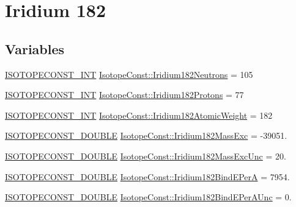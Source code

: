 \hypertarget{group___isotope_const-_iridium-_ir182}{}\section{Iridium 182}
\label{group___isotope_const-_iridium-_ir182}
\subsection*{Variables}
\begin{DoxyCompactItemize}
\item 
\mbox{\hyperlink{group___isotope_const-_macros_ga5f18360b3e99483a35c32d789e62621c}{I\+S\+O\+T\+O\+P\+E\+C\+O\+N\+S\+T\+\_\+\+I\+NT}} \mbox{\hyperlink{group___isotope_const-_iridium-_ir182_gabb4e1b8047cf5df11a85dc624a50e36e}{Isotope\+Const\+::\+Iridium182\+Neutrons}} = 105
\item 
\mbox{\hyperlink{group___isotope_const-_macros_ga5f18360b3e99483a35c32d789e62621c}{I\+S\+O\+T\+O\+P\+E\+C\+O\+N\+S\+T\+\_\+\+I\+NT}} \mbox{\hyperlink{group___isotope_const-_iridium-_ir182_ga7036bb3d763cc69754fbcff4b23de615}{Isotope\+Const\+::\+Iridium182\+Protons}} = 77
\item 
\mbox{\hyperlink{group___isotope_const-_macros_ga5f18360b3e99483a35c32d789e62621c}{I\+S\+O\+T\+O\+P\+E\+C\+O\+N\+S\+T\+\_\+\+I\+NT}} \mbox{\hyperlink{group___isotope_const-_iridium-_ir182_ga831ca03cf5ecca7d496893c365608e22}{Isotope\+Const\+::\+Iridium182\+Atomic\+Weight}} = 182
\item 
\mbox{\hyperlink{group___isotope_const-_macros_ga8f45a7272ce02c0b4c65c44636ed719a}{I\+S\+O\+T\+O\+P\+E\+C\+O\+N\+S\+T\+\_\+\+D\+O\+U\+B\+LE}} \mbox{\hyperlink{group___isotope_const-_iridium-_ir182_gacb118eef40e03bed976aadfe7d282056}{Isotope\+Const\+::\+Iridium182\+Mass\+Exc}} = -\/39051.
\item 
\mbox{\hyperlink{group___isotope_const-_macros_ga8f45a7272ce02c0b4c65c44636ed719a}{I\+S\+O\+T\+O\+P\+E\+C\+O\+N\+S\+T\+\_\+\+D\+O\+U\+B\+LE}} \mbox{\hyperlink{group___isotope_const-_iridium-_ir182_ga818229448a212a79c7c3234def8a715d}{Isotope\+Const\+::\+Iridium182\+Mass\+Exc\+Unc}} = 20.
\item 
\mbox{\hyperlink{group___isotope_const-_macros_ga8f45a7272ce02c0b4c65c44636ed719a}{I\+S\+O\+T\+O\+P\+E\+C\+O\+N\+S\+T\+\_\+\+D\+O\+U\+B\+LE}} \mbox{\hyperlink{group___isotope_const-_iridium-_ir182_gadf2261191292611ed423a872e83d8495}{Isotope\+Const\+::\+Iridium182\+Bind\+E\+PerA}} = 7954.
\item 
\mbox{\hyperlink{group___isotope_const-_macros_ga8f45a7272ce02c0b4c65c44636ed719a}{I\+S\+O\+T\+O\+P\+E\+C\+O\+N\+S\+T\+\_\+\+D\+O\+U\+B\+LE}} \mbox{\hyperlink{group___isotope_const-_iridium-_ir182_gadce3cdb501b2f57b4520748d60bd4f76}{Isotope\+Const\+::\+Iridium182\+Bind\+E\+Per\+A\+Unc}} = 0.

\end{DoxyCompactItemize}
